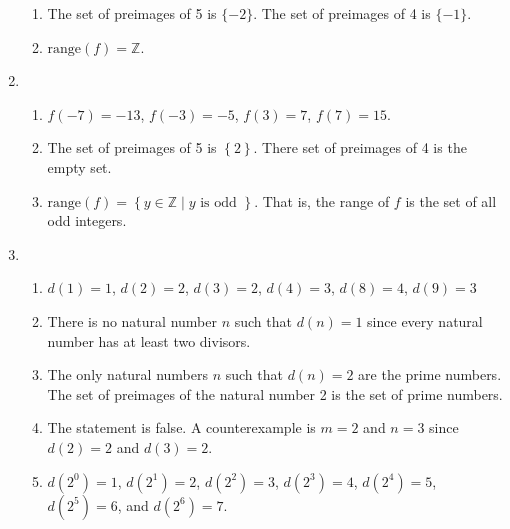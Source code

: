 \begin{enumerate}
\begin{enumerate}
\item The set of preimages of 5 is $\{ -2 \}$. The set of preimages of 4 is $\{ -1 \}$.

\item $\text{range} \left( f \right) = \mathbb{Z}$.
\end{enumerate}




\item \begin{enumerate}
\item 
$f \left( -7 \right) = -13$, 
$f \left( -3 \right) = -5$, 
$f \left( 3 \right) = 7$, 
$f \left( 7 \right) = 15$.

\item The set of preimages of  5 is  $\left\{ 2 \right\}$.  There set of preimages of 4 is 
the empty set.

\item $\text{range} \left( f \right) = \left\{ y \in \mathbb{Z} \mid y \text{ is odd } \right\}$.  That is, the range of $f$ is the set of all odd integers.
\end{enumerate}




\item \begin{enumerate}
\item $d ( 1 ) = 1$, $d ( 2 ) = 2$, $d ( 3 ) = 2$, 
$d ( 4 ) = 3$, $d ( 8 ) = 4$, $d ( 9 ) = 3$

\item There is no natural number $n$ such that $d ( n ) = 1$ since every natural number has at least two divisors.

\item The only natural numbers  $n$  such that $d( n ) = 2$   are the prime numbers. The set of preimages of the natural number  2 is the set of prime numbers.

\item The statement is false.  A counterexample is $m = 2$ and $n = 3$ since 
$d( 2 ) = 2$ and $d( 3 ) = 2$.

\item $d \left( 2^0 \right) = 1$, $d \left( 2^1 \right) = 2$, $d \left( 2^2 \right) = 3$, 
$d \left( 2^3 \right) = 4$, $d \left( 2^4 \right) = 5$, \\
$d \left( 2^5 \right) = 6$, and $d \left( 2^6 \right) = 7$.


\end{enumerate}
\end{enumerate}
